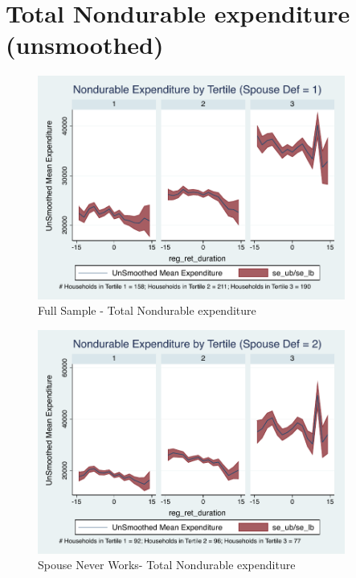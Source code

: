 \documentclass[a4paper]{article}
\begin{document}
\clearpage


\section{Total Nondurable expenditure (unsmoothed)}

\begin{figure}[h]
	\caption{Full Sample - Total Nondurable expenditure}
	\centering
	\includegraphics[width=0.9\textwidth]{../ConsumptionPostRetirement_by_SpouseDef/UnSmoothed/spouse_def_1.pdf}
\end{figure}



\begin{figure}[H]
	\caption{Spouse Never Works- Total Nondurable expenditure}
	\centering
	\includegraphics[width=0.9\textwidth]{../ConsumptionPostRetirement_by_SpouseDef/UnSmoothed/spouse_def_2.pdf}
\end{figure}
\end{document}

